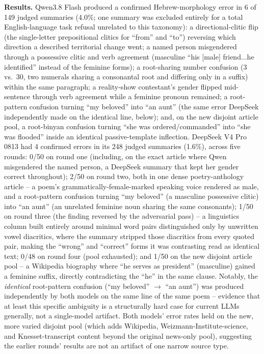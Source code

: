 \documentclass[11pt]{article}
\begin{document}
\textbf{Results.} Qwen3.8 Flash produced a confirmed Hebrew-morphology error in 6 of 149 judged summaries (4.0\%; one summary was excluded entirely for a total English-language task refusal unrelated to this taxonomy): a directional-clitic flip (the single-letter prepositional clitics for ``from'' and ``to'') reversing which direction a described territorial change went; a named person misgendered through a possessive clitic and verb agreement (masculine ``his [male] friend...he identified'' instead of the feminine forms); a root-sharing number confusion (3 vs.\ 30, two numerals sharing a consonantal root and differing only in a suffix) within the same paragraph; a reality-show contestant's gender flipped mid-sentence through verb agreement while a feminine pronoun remained; a root-pattern confusion turning ``my beloved'' into ``an aunt'' (the same error DeepSeek independently made on the identical line, below); and, on the new disjoint article pool, a root-binyan confusion turning ``she was ordered/commanded'' into ``she was flooded'' inside an identical passive-template inflection. DeepSeek V4 Pro 0813 had 4 confirmed errors in its 248 judged summaries (1.6\%), across five rounds: 0/50 on round one (including, on the exact article where Qwen misgendered the named person, a DeepSeek summary that kept her gender correct throughout); 2/50 on round two, both in one dense poetry-anthology article -- a poem's grammatically-female-marked speaking voice rendered as male, and a root-pattern confusion turning ``my beloved'' (a masculine possessive clitic) into ``an aunt'' (an unrelated feminine noun sharing the same consonants); 1/50 on round three (the finding reversed by the adversarial pass) -- a linguistics column built entirely around minimal word pairs distinguished only by unwritten vowel diacritics, where the summary stripped those diacritics from every quoted pair, making the ``wrong'' and ``correct'' forms it was contrasting read as identical text; 0/48 on round four (pool exhausted); and 1/50 on the new disjoint article pool -- a Wikipedia biography where ``he serves as president'' (masculine) gained a feminine suffix, directly contradicting the ``he'' in the same clause. Notably, the \emph{identical} root-pattern confusion (``my beloved'' $\to$ ``an aunt'') was produced independently by both models on the same line of the same poem -- evidence that at least this specific ambiguity is a structurally hard case for current LLMs generally, not a single-model artifact. Both models' error rates held on the new, more varied disjoint pool (which adds Wikipedia, Weizmann-Institute-science, and Knesset-transcript content beyond the original news-only pool), suggesting the earlier rounds' results are not an artifact of one narrow source type.
\end{document}
